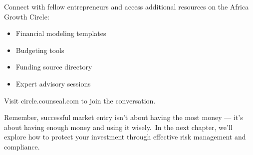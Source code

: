 \begin{communitybox}
Connect with fellow entrepreneurs and access additional resources on the Africa Growth Circle:
\begin{itemize}
    \item Financial modeling templates
    \item Budgeting tools
    \item Funding source directory
    \item Expert advisory sessions
\end{itemize}
Visit circle.counseal.com to join the conversation.
\end{communitybox}

\begin{importantbox}
Remember, successful market entry isn't about having the most money --- it's about having enough money and using it wisely.\ In the next chapter, we'll explore how to protect your investment through effective risk management and compliance.
\end{importantbox}
